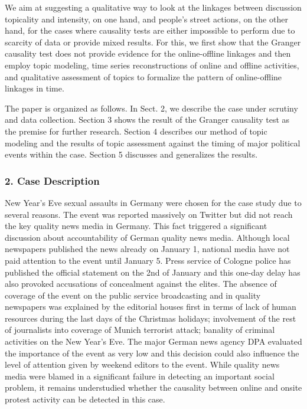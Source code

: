 We aim at suggesting a qualitative way to look at the linkages between discussion topicality and intensity, on one hand, and people’s street actions, on the other hand, for the cases where causality tests are either impossible to perform due to scarcity of data or provide mixed results. For this, we first show that the Granger causality test does not provide evidence for the online-offline linkages and then employ topic modeling, time series reconstructions of online and offline activities, and qualitative assessment of topics to formalize the pattern of online-offline linkages in time.

The paper is organized as follows. In Sect. 2, we describe the case under scrutiny and data collection. Section 3 shows the result of the Granger causality test as the premise for further research. Section 4 describes our method of topic modeling and the results of topic assessment against the timing of major political events within the case. Section 5 discusses and generalizes the results.

\subsubsection{2. Case Description}

New Year’s Eve sexual assaults in Germany were chosen for the case study due to several reasons. The event was reported massively on Twitter but did not reach the key quality news media in Germany. This fact triggered a significant discussion about accountability of German quality news media. Although local newspapers published the news already on January 1, national media have not paid attention to the event until January 5. Press service of Cologne police has published the official statement on the 2nd of January and this one-day delay has also provoked accusations of concealment against the elites. The absence of coverage of the event on the public service broadcasting and in quality newspapers was explained by the editorial houses first in terms of lack of human resources during the last days of the Christmas holidays; involvement of the rest of journalists into coverage of Munich terrorist attack; banality of criminal activities on the New Year’s Eve. The major German news agency DPA evaluated the importance of the event as very low and this decision could also influence the level of attention given by weekend editors to the event. While quality news media were blamed in a significant failure in detecting an important social problem, it remains understudied whether the causality between online and onsite protest activity can be detected in this case.

